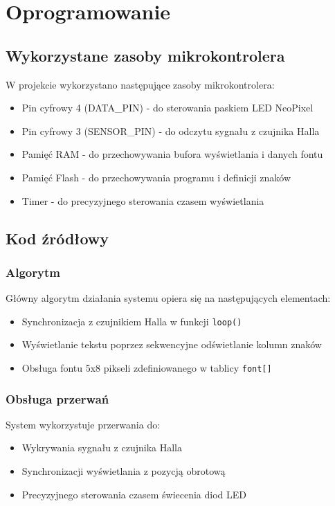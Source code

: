 \documentclass{article}
\begin{document}
\section{Oprogramowanie}
\subsection{Wykorzystane zasoby mikrokontrolera}
W projekcie wykorzystano następujące zasoby mikrokontrolera:
\begin{itemize}
    \item Pin cyfrowy 4 (DATA\_PIN) - do sterowania paskiem LED NeoPixel
    \item Pin cyfrowy 3 (SENSOR\_PIN) - do odczytu sygnału z czujnika Halla
    \item Pamięć RAM - do przechowywania bufora wyświetlania i danych fontu
    \item Pamięć Flash - do przechowywania programu i definicji znaków
    \item Timer - do precyzyjnego sterowania czasem wyświetlania
\end{itemize}

\subsection{Kod źródłowy}
\subsubsection{Algorytm}
Główny algorytm działania systemu opiera się na następujących elementach:
\begin{itemize}
    \item Synchronizacja z czujnikiem Halla w funkcji \texttt{loop()}
    \item Wyświetlanie tekstu poprzez sekwencyjne odświetlanie kolumn znaków
    \item Obsługa fontu 5x8 pikseli zdefiniowanego w tablicy \texttt{font[]}
\end{itemize}

\subsubsection{Obsługa przerwań}
System wykorzystuje przerwania do:
\begin{itemize}
    \item Wykrywania sygnału z czujnika Halla
    \item Synchronizacji wyświetlania z pozycją obrotową
    \item Precyzyjnego sterowania czasem świecenia diod LED
\end{itemize}
\end{document}
